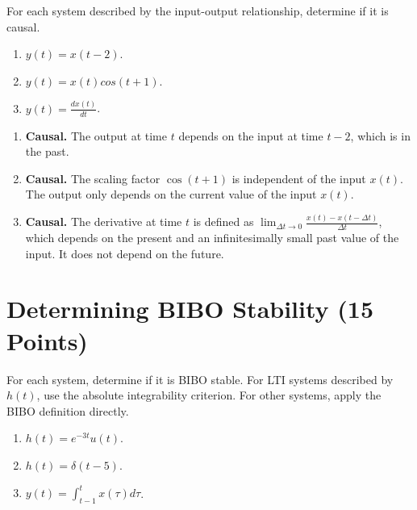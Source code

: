 \documentclass[12pt,xcolor=dvipsnames,svgnames,x11names]{article}
\begin{document}
For each system described by the input-output relationship, determine if it is causal.

\begin{enumerate}
\item $y(t) = x(t-2)$.

\item $y(t)=x(t)cos(t+1)$.

\item $y(t) = \frac{dx(t)}{dt}$.

\end{enumerate}

\begin{answerbox}

\begin{enumerate}

\item \textbf{Causal.}  The output at time $ t $ depends on the input at time $ t-2 $, which is in the past.

\item \textbf{Causal.} The scaling factor $ \cos(t+1) $ is independent of the input $ x(t) $. The output only depends on the current value of the input $ x(t) $.

\item \textbf{Causal.} The derivative at time $ t $ is defined as $ \lim_{\Delta t \to 0} \frac{x(t) - x(t - \Delta t)}{\Delta t} $, which depends on the present and an infinitesimally small past value of the input. It does not depend on the future.

\end{enumerate}
\end{answerbox}

\section{Determining BIBO Stability (15 Points)}

For each system, determine if it is BIBO stable. For LTI systems described by 
$h(t)$, use the absolute integrability criterion. For other systems, apply the BIBO definition directly.

\begin{enumerate}
\item $h(t) = e^{-3t}u(t)$.
\item $h(t) = \delta
(t-5)$.
\item $y(t) = \int_{t-1}^t x(\tau)d\tau$.
\end{enumerate}
\end{document}
